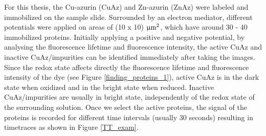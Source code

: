 \documentclass[twoside,single]{lion-msc}
\begin{document}
For this thesis, the Cu-azurin (CuAz) and Zn-azurin (ZnAz) were labeled and immobilized on the sample slide. Surrounded by an electron mediator, different potentials were applied on areas of (10 x 10) $\upmu \textup{m}^{2}$, which have around 30 - 40 immobilized proteins. Initially applying a positive and negative potential, by analysing the fluorescence lifetime and fluorescence intensity, the active CuAz and inactive CuAz/impurities can be identified immediately after taking the images. Since the redox state affects directly the fluorescence lifetime and fluorescence intensity of the dye (see Figure \ref{finding_proteins_1}),  active CuAz is in the dark state when oxidized and in the bright state when reduced. Inactive CuAz/impurities are usually in bright state, independently of the redox state of the surrounding solution. Once we select the active proteins, the signal of the proteins is recorded for different time intervals (usually 30 seconds) resulting in timetraces as shown in Figure \ref{TT_exam}.
\end{document}
